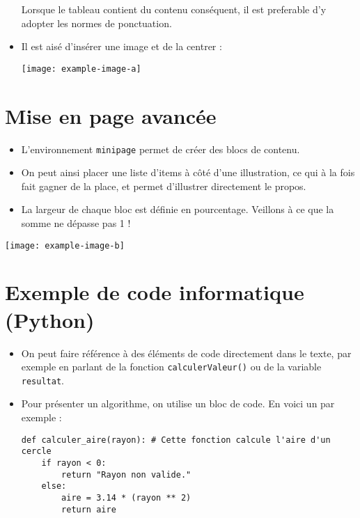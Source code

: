 \documentclass[a4paper,12pt]{article}
\begin{document}
\begin{itemize}
    Lorsque le tableau contient du contenu conséquent, il est preferable d'y adopter les normes de ponctuation.

    \item Il est aisé d'insérer une image et de la centrer :
    \begin{center}
        \texttt{[image: example-image-a]}
    \end{center}    

\end{itemize}


\section{Mise en page avancée}

\noindent
\begin{minipage}[c]{0.55\textwidth}
    \begin{itemize}[itemsep=0.5\baselineskip]
        \item L'environnement \texttt{minipage} permet de créer des blocs de contenu.
        \item On peut ainsi placer une liste d'items à côté d'une illustration, ce qui à la fois fait gagner de la place, et permet d'illustrer directement le propos.
        \item La largeur de chaque bloc est définie en pourcentage. Veillons à ce que la somme ne dépasse pas 1 !
    \end{itemize}
\end{minipage}%
\begin{minipage}[c]{0.45\textwidth}
    \centering
    \texttt{[image: example-image-b]} 
\end{minipage}



\section{Exemple de code informatique (Python)}

\begin{itemize}
    \item On peut faire référence à des éléments de code directement dans le texte, par exemple en parlant de la fonction \texttt{calculerValeur()} ou de la variable \texttt{resultat}.
    
    \item Pour présenter un algorithme, on utilise un bloc de code. En voici un par exemple :
    
\begin{lstlisting}
def calculer_aire(rayon): # Cette fonction calcule l'aire d'un cercle
    if rayon < 0:
        return "Rayon non valide."
    else:
        aire = 3.14 * (rayon ** 2)
        return aire
\end{lstlisting}
\end{itemize}
\end{document}
